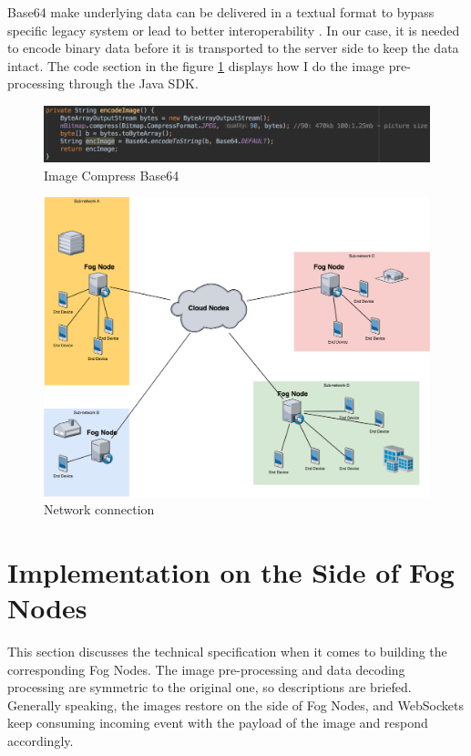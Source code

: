 Base64 make underlying data can be delivered in a textual format to bypass specific legacy system or lead to better interoperability  \cite{josefsson2006base16}. In our case, it is needed to encode binary data before it is transported to the server side to keep the data intact. The code section in the figure \ref{fig:png_base64} displays how I do the image pre-processing through the Java SDK.

\begin{figure}
    \centering
    \includegraphics[width=\textwidth]{images/png&base64.png}
    \caption{Image Compress  Base64}
    \label{fig:png_base64}
\end{figure}



\begin{figure}
    \centering
    \includegraphics[width=\textwidth]{images/network.png}
    \caption{Network connection}
    \label{fig:network}
\end{figure}


\section{Implementation on the Side of Fog Nodes}
This section discusses the technical specification when it comes to building the corresponding Fog Nodes. The image pre-processing and data decoding processing are symmetric to the original one, so descriptions are briefed. Generally speaking, the images restore on the side of Fog Nodes, and WebSockets keep consuming incoming event with the payload of the image and respond accordingly.

